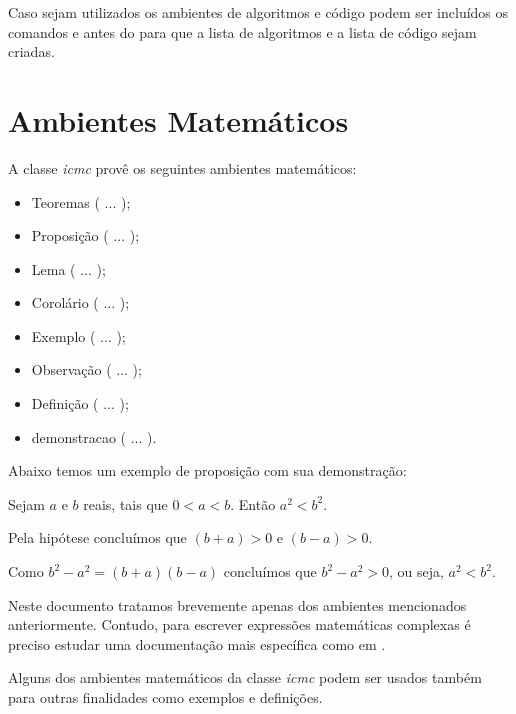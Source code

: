 Caso sejam utilizados os ambientes de algoritmos e código podem ser incluídos os comandos  e  antes do  para que a lista de algoritmos e a lista de código sejam criadas.


\section{Ambientes Matemáticos}

A classe \textit{icmc} provê os seguintes ambientes matemáticos:
\begin{itemize}
 \item Teoremas ( ... );
 \item Proposição ( ... );
 \item Lema ( ... );
 \item Corolário ( ... );
 \item Exemplo ( ... );
 \item Observação ( ... );
 \item Definição ( ... );
 \item demonstracao ( ... ).
\end{itemize}

Abaixo temos um exemplo de proposição com sua demonstração:
\begin{proposicao}
 Sejam $a$ e $b$ reais, tais que $0<a<b$. Então $a^2<b^2$.
\end{proposicao}
\begin{demonstracao}
 Pela hipótese concluímos que $(b+a)>0$ e $(b-a)>0$.

Como $b^2-a^2=(b+a)(b-a)$ concluímos que $b^2-a^2>0$, ou seja, $a^2<b^2$.
\end{demonstracao}

Neste documento tratamos brevemente apenas dos ambientes mencionados anteriormente. Contudo, para escrever expressões matemáticas complexas é preciso estudar uma documentação mais específica como em .

Alguns dos ambientes matemáticos da classe \textit{icmc} podem ser usados também para outras finalidades como exemplos e definições.


